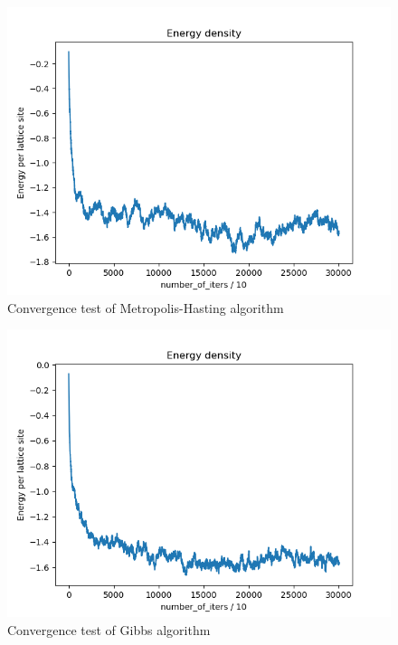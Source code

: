 \documentclass{article}
\begin{document}
    \begin{figure}[ht]
        \includegraphics[width=\columnwidth]{plots/energy_density_mh.png}
        \caption{Convergence test of Metropolis-Hasting algorithm}
        \label{fig:3}
    \end{figure}

    \begin{figure}[ht]
        \includegraphics[width=\columnwidth]{plots/energy_density_gibbs.png}
        \caption{Convergence test of Gibbs algorithm}
        \label{fig:3}
    \end{figure}
\end{document}
